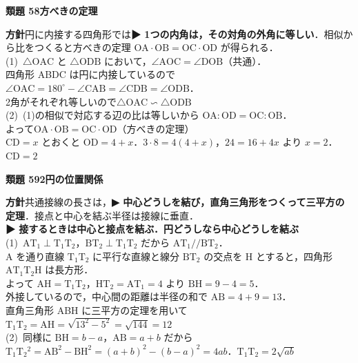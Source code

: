 \documentclass[a4paper,11pt]{ltjsarticle}
\newcommand{\ans}[2]{\Needspace{5\baselineskip}\vspace{6pt}%
  {\sffamily\bfseries 類題 #1\quad #2}\par}
\newcommand{\point}[1]{\textsf{\bfseries ▶ #1}}
\begin{document}
\ans{58}{方べきの定理}
\begin{kai}
\textbf{方針}\quad 円に内接する四角形では\point{1つの内角は，その対角の外角に等しい}．相似から比をつくると方べきの定理 $\mathrm{OA}\cdot\mathrm{OB}=\mathrm{OC}\cdot\mathrm{OD}$ が得られる．\\[2pt]
(1)\ $\triangle\mathrm{OAC}$ と $\triangle\mathrm{ODB}$ において，$\angle\mathrm{AOC}=\angle\mathrm{DOB}$（共通）．\\
\hspace*{1.5em}四角形 ABDC は円に内接しているので $\angle\mathrm{OAC}=180^\circ-\angle\mathrm{CAB}=\angle\mathrm{CDB}=\angle\mathrm{ODB}$．\\
\hspace*{1.5em}2角がそれぞれ等しいので\quad $\triangle\mathrm{OAC}\backsim\triangle\mathrm{ODB}$\\[2pt]
(2)\ (1)の相似で対応する辺の比は等しいから $\mathrm{OA}:\mathrm{OD}=\mathrm{OC}:\mathrm{OB}$．\\
\hspace*{1.5em}よって\quad $\mathrm{OA}\cdot\mathrm{OB}=\mathrm{OC}\cdot\mathrm{OD}$\quad （方べきの定理）\\
\hspace*{1.5em}$\mathrm{CD}=x$ とおくと $\mathrm{OD}=4+x$．$3\cdot8=4(4+x)$，\quad $24=16+4x$ より $x=2$．\quad $\mathrm{CD}=2$
\end{kai}

\ans{59}{2円の位置関係}
\begin{kai}
\textbf{方針}\quad 共通接線の長さは，\point{中心どうしを結び，直角三角形をつくって三平方の定理}．接点と中心を結ぶ半径は接線に垂直．\\[2pt]
\point{接するときは中心と接点を結ぶ．円どうしなら中心どうしを結ぶ}\\
(1)\ $\mathrm{AT}_1\perp\mathrm T_1\mathrm T_2$，$\mathrm{BT}_2\perp\mathrm T_1\mathrm T_2$ だから $\mathrm{AT}_1/\!/\mathrm{BT}_2$．\\
\hspace*{1.5em}A を通り直線 $\mathrm T_1\mathrm T_2$ に平行な直線と線分 $\mathrm{BT}_2$ の交点を H とすると，四角形 $\mathrm{AT}_1\mathrm T_2\mathrm H$ は長方形．\\
\hspace*{1.5em}よって $\mathrm{AH}=\mathrm T_1\mathrm T_2$，\quad $\mathrm{HT}_2=\mathrm{AT}_1=4$ より $\mathrm{BH}=9-4=5$．\\
\hspace*{1.5em}外接しているので，中心間の距離は半径の和で $\mathrm{AB}=4+9=13$．\\
\hspace*{1.5em}直角三角形 ABH に三平方の定理を用いて\quad $\mathrm T_1\mathrm T_2=\mathrm{AH}=\sqrt{13^2-5^2}=\sqrt{144}=12$\\[2pt]
(2)\ 同様に $\mathrm{BH}=b-a$，$\mathrm{AB}=a+b$ だから\\
\hspace*{1.5em}$\mathrm T_1\mathrm T_2{}^2=\mathrm{AB}^2-\mathrm{BH}^2=(a+b)^2-(b-a)^2=4ab$．\quad $\mathrm T_1\mathrm T_2=2\sqrt{ab}$
\end{kai}
\end{document}

